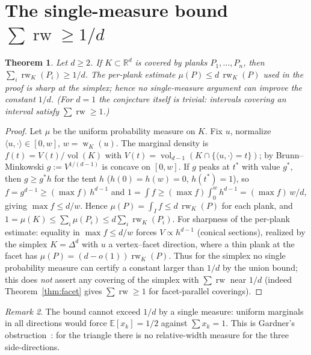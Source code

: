 \documentclass[11pt,reqno]{amsart}
\theoremstyle{plain}
\newtheorem{theorem}{Theorem}[section]
\theoremstyle{definition}
\theoremstyle{remark}
\newtheorem{remark}[theorem]{Remark}
\newcommand{\rw}{\operatorname{rw}}
\newcommand{\R}{\mathbb{R}}
\DeclareMathOperator{\wid}{w}
\DeclareMathOperator{\vol}{vol}
\begin{document}
\section{The single-measure bound $\sum\rw\ge 1/d$}\label{sec:measure}
\begin{theorem}\label{thm:oned}
Let $d\ge2$. If $K\subset\R^d$ is covered by planks $P_1,\dots,P_n$, then
$\sum_i\rw_K(P_i)\ge 1/d$. The per-plank estimate $\mu(P)\le d\,\rw_K(P)$ used in the
proof is sharp at the simplex; hence no single-measure argument can improve the
constant $1/d$. (For $d=1$ the conjecture itself is trivial: intervals covering an
interval satisfy $\sum\rw\ge1$.)
\end{theorem}
\begin{proof}
Let $\mu$ be the uniform probability measure on $K$. Fix $u$, normalize
$\langle u,\cdot\rangle\in[0,w]$, $w=\wid_K(u)$. The marginal density is
$f(t)=V(t)/\vol(K)$ with $V(t)=\vol_{d-1}(K\cap\{\langle u,\cdot\rangle=t\})$; by
Brunn--Minkowski $g:=V^{1/(d-1)}$ is concave on $[0,w]$. If $g$ peaks at $t^\ast$
with value $g^\ast$, then $g\ge g^\ast h$ for the tent $h$ ($h(0)=h(w)=0$,
$h(t^\ast)=1$), so $f=g^{d-1}\ge(\max f)\,h^{d-1}$ and
$1=\int f\ge(\max f)\int_0^w h^{d-1}=(\max f)\,w/d$, giving $\max f\le d/w$. Hence
$\mu(P)=\int_I f\le d\,\rw_K(P)$ for each plank, and
$1=\mu(K)\le\sum_i\mu(P_i)\le d\sum_i\rw_K(P_i)$. For sharpness of the per-plank
estimate: equality in $\max f\le d/w$ forces $V\propto h^{d-1}$ (conical sections),
realized by the simplex $K=\Delta^d$ with $u$ a vertex--facet direction, where a
thin plank at the facet has $\mu(P)=(d-o(1))\rw_K(P)$. Thus for the simplex no
single probability measure can certify a constant larger than $1/d$ by the union
bound; this does \emph{not} assert any covering of the simplex with
$\sum\rw$ near $1/d$ (indeed Theorem~\ref{thm:facet} gives $\sum\rw\ge1$ for
facet-parallel coverings).
\end{proof}
\begin{remark}
The bound cannot exceed $1/d$ by a single measure: uniform marginals in all
directions would force $\mathbb E[x_k]=1/2$ against $\sum x_k=1$. This is Gardner's
obstruction~\cite{Gardner88}: for the triangle there is no relative-width measure
for the three side-directions.
\end{remark}
\end{document}
